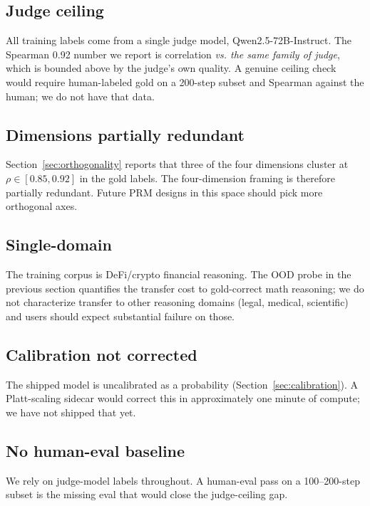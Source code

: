 \documentclass[10pt,letterpaper]{article}
\begin{document}
\subsection{Judge ceiling}

All training labels come from a single judge model, Qwen2.5-72B-Instruct. The Spearman 0.92 number we report is correlation \emph{vs. the same family of judge}, which is bounded above by the judge's own quality. A genuine ceiling check would require human-labeled gold on a 200-step subset and Spearman against the human; we do not have that data.

\subsection{Dimensions partially redundant}

Section~\ref{sec:orthogonality} reports that three of the four dimensions cluster at $\rho \in [0.85, 0.92]$ in the gold labels. The four-dimension framing is therefore partially redundant. Future PRM designs in this space should pick more orthogonal axes.

\subsection{Single-domain}

The training corpus is DeFi/crypto financial reasoning. The OOD probe in the previous section quantifies the transfer cost to gold-correct math reasoning; we do not characterize transfer to other reasoning domains (legal, medical, scientific) and users should expect substantial failure on those.

\subsection{Calibration not corrected}

The shipped model is uncalibrated as a probability (Section~\ref{sec:calibration}). A Platt-scaling sidecar would correct this in approximately one minute of compute; we have not shipped that yet.

\subsection{No human-eval baseline}

We rely on judge-model labels throughout. A human-eval pass on a 100--200-step subset is the missing eval that would close the judge-ceiling gap.
\end{document}
